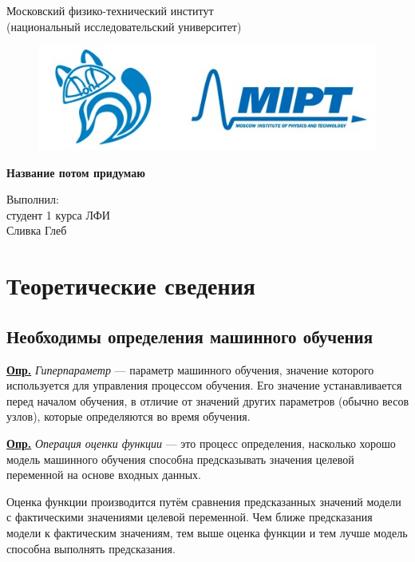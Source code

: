 \documentclass[a4paper,14pt]{extarticle}
\begin{document}
		\begin{titlepage}
			\begin{center}
				\large Московский физико-технический институт\\
				(национальный исследовательский университет)\\
				\vspace{1cm}
				\begin{figure}[h!]
					\centering
					\includegraphics[width=0.7\linewidth]{MIPT.jpeg}
					\label{fig:mpr}
				\end{figure}
				\vspace{4cm}
				\textbf {Название потом придумаю}\\
			\end{center}
			
			\vspace{9cm}
			{\par \raggedleft \large Выполнил:\\ студент 1 курса ЛФИ \\ Сливка Глеб \par}
		\end{titlepage}
		\tableofcontents
		\newpage
		\section{Теоретические сведения}
		
		\subsection{Необходимы определения машинного обучения}
		\textbf{\underline{Опр.}} \textit{Гиперпараметр} --- параметр машинного обучения, значение которого используется для управления процессом обучения. Его значение устанавливается перед началом обучения, в отличие от значений других параметров (обычно весов узлов), которые определяются во время обучения.
		
		\textbf{\underline{Опр.}} \textit{Операция оценки функции} --- это процесс определения, насколько хорошо модель машинного обучения способна предсказывать значения целевой переменной на основе входных данных.
		
		Оценка функции производится путём сравнения предсказанных значений модели с фактическими значениями целевой переменной. Чем ближе предсказания модели к фактическим значениям, тем выше оценка функции и тем лучше модель способна выполнять предсказания.
		
\end{document}
